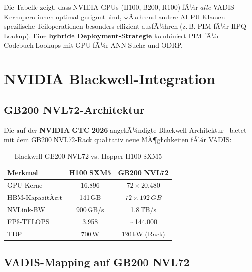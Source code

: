﻿\documentclass[12pt,a4paper]{article}
\begin{document}
\noindent Die Tabelle zeigt, dass NVIDIA-GPUs (H100, B200, R100) fÃ¼r
\emph{alle} VADIS-Kernoperationen optimal geeignet sind,
wÃ¤hrend andere AI-PU-Klassen spezifische Teiloperationen
besonders effizient ausfÃ¼hren (z.\,B. PIM fÃ¼r HPQ-Lookup).
Eine \textbf{hybride Deployment-Strategie} kombiniert
PIM fÃ¼r Codebuch-Lookups mit GPU fÃ¼r ANN-Suche und ODRP.

\section{NVIDIA Blackwell-Integration}
\label{sec:blackwell}

\subsection{GB200 NVL72-Architektur}

Die auf der \textbf{NVIDIA GTC 2026} angekÃ¼ndigte
Blackwell-Architektur~\cite{nvidia2025blackwell} bietet
mit dem GB200 NVL72-Rack qualitativ neue MÃ¶glichkeiten fÃ¼r VADIS:

\begin{table}[ht]
\centering
\small
\caption{Blackwell GB200 NVL72 vs. Hopper H100 SXM5}
\label{tab:blackwell}
\begin{tabular}{@{}lcc@{}}
\toprule
\textbf{Merkmal} & \textbf{H100 SXM5} & \textbf{GB200 NVL72} \\
\midrule
GPU-Kerne & 16.896 & $72 \times 20.480$ \\
HBM-KapazitÃ¤t & 141\,GB & $72 \times 192\,GB$ \\
NVLink-BW & 900\,GB/s & 1.8\,TB/s \\
FP8-TFLOPS & 3.958 & $\sim$144.000 \\
TDP & 700\,W & 120\,kW (Rack) \\
\bottomrule
\end{tabular}
\end{table}

\subsection{VADIS-Mapping auf GB200 NVL72}
\end{document}
